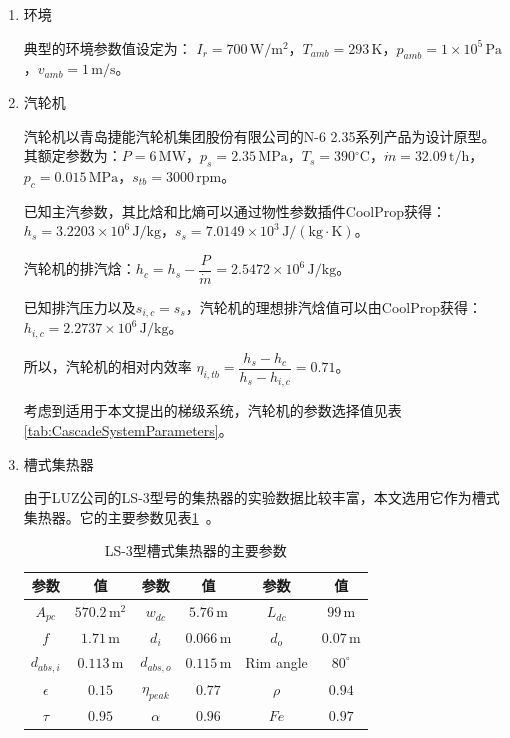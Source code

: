 \begin{enumerate}[label=(\arabic*)]

\item 环境

\setlength\parindent{2em}典型的环境参数值设定为：
$I_r = 700\,\mathrm{W/m^2}$，$T_{amb} = 293\,\mathrm{K}$，$p_{amb} = 1\times10^5\,\mathrm{Pa}$，$v_{amb} = 1\,\mathrm{m/s}$。

\item 汽轮机

汽轮机以青岛捷能汽轮机集团股份有限公司的N-6 2.35系列产品为设计原型。其额定参数为：$P = 6\,\mathrm{MW}$，$p_s = 2.35\,\mathrm{MPa}$，$T_s = 390\mathrm{^\circ C}$，$\dot{m} = 32.09\,\mathrm{t/h}$，$p_c = 0.015\,\mathrm{MPa}$，$s_{tb} = 3000\,\mathrm{rpm}$。
	
	已知主汽参数，其比焓和比熵可以通过物性参数插件CoolProp获得：$h_s = 3.2203\times10^6\,\mathrm{J/kg}$，$s_s = 7.0149\times10^3\,\mathrm{J/(kg\cdot K)}$。
	
	汽轮机的排汽焓：$h_{c} = h_{s} - \dfrac{P}{\dot{m}} = 2.5472\times10^6\,\mathrm{J/kg}$。
	
	已知排汽压力以及$s_{i,c} = s_s$，汽轮机的理想排汽焓值可以由CoolProp获得：$h_{i,c} = 2.2737\times10^6\,\mathrm{J/kg}$。
	
	所以，汽轮机的相对内效率
	$\eta_{i,tb} = \dfrac{h_s - h_c}{h_{s} - h_{i,c}} = 0.71$。
	
	考虑到适用于本文提出的梯级系统，汽轮机的参数选择值见表\ref{tab:CascadeSystemParameters}。
		 
\item 槽式集热器

由于LUZ公司的LS-3型号的集热器的实验数据比较丰富，本文选用它作为槽式集热器。它的主要参数见表\ref{tab:TroughParameters}~\cite{Fernandez2010}。

\begin{table}[htbp]
\setlength{\abovecaptionskip}{0pt}
	\caption{LS-3型槽式集热器的主要参数}
	\centering
	\begin{tabular}{cccccc}
		\toprule
		参数		&	值	&	参数		&	值	&	参数		&	值\\
		\midrule
		$A_{pc}$		&	$570.2\,\mathrm{m^2}$	&	$w_{dc}$	&	$5.76\,\mathrm{m}$	&	$L_{dc}$	&	$99\,\mathrm{m}$\\
		$f$	&	$1.71\,\mathrm{m}$	&	$d_i$		&	$0.066\,\mathrm{m}$	&	$d_o$	&	$0.07\,\mathrm{m}$\\
		$d_{abs,i}$	&	$0.113\,\mathrm{m}$	&	$d_{abs,o}$	&	$0.115\,\mathrm{m}$	&	Rim angle	&	$80^\circ$\\
		$\epsilon$		&	$0.15$	&	$\eta_{peak}$	&	$0.77$	&	$\rho$	&	$0.94$\\
		$\tau$	&	$0.95$	&	
$\alpha$	&	$0.96$	&	$Fe$	&	$0.97$\\
		\bottomrule
	\end{tabular}
	\label{tab:TroughParameters}
\end{table}


\end{enumerate}
